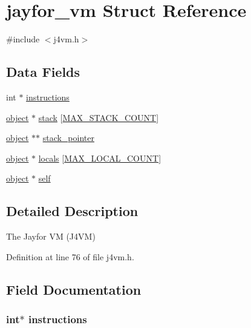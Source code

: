 \hypertarget{structjayfor__vm}{\section{jayfor\+\_\+vm Struct Reference}
\label{structjayfor__vm}
}


{\ttfamily \#include $<$j4vm.\+h$>$}

\subsection*{Data Fields}
\begin{DoxyCompactItemize}
\item 
int $\ast$ \hyperlink{structjayfor__vm_a31f89c9149d1e9e5f80e8e888da9e891}{instructions}
\item 
\hyperlink{structobject}{object} $\ast$ \hyperlink{structjayfor__vm_a38909de25e024c1fcd1ed38094cefbff}{stack} \mbox{[}\hyperlink{j4vm_8h_a00a344b4e30a01f0b7b9ebbf61c36993}{M\+A\+X\+\_\+\+S\+T\+A\+C\+K\+\_\+\+C\+O\+U\+N\+T}\mbox{]}
\item 
\hyperlink{structobject}{object} $\ast$$\ast$ \hyperlink{structjayfor__vm_a8b3f92ea26da8098f5e4f4404e8e3334}{stack\+\_\+pointer}
\item 
\hyperlink{structobject}{object} $\ast$ \hyperlink{structjayfor__vm_acbb8263d413c9418484d2d8fe1d3e942}{locals} \mbox{[}\hyperlink{j4vm_8h_af06fe41117122fd3680b57042005d3a7}{M\+A\+X\+\_\+\+L\+O\+C\+A\+L\+\_\+\+C\+O\+U\+N\+T}\mbox{]}
\item 
\hyperlink{structobject}{object} $\ast$ \hyperlink{structjayfor__vm_a30bf32adebb387eaeaeb9387672cca3d}{self}
\end{DoxyCompactItemize}


\subsection{Detailed Description}
The Jayfor V\+M (J4\+V\+M) 

Definition at line 76 of file j4vm.\+h.



\subsection{Field Documentation}
\hypertarget{structjayfor__vm_a31f89c9149d1e9e5f80e8e888da9e891}{
\subsubsection[{instructions}]{\setlength{\rightskip}{0pt plus 5cm}int$\ast$ instructions}}\label{structjayfor__vm_a31f89c9149d1e9e5f80e8e888da9e891}



